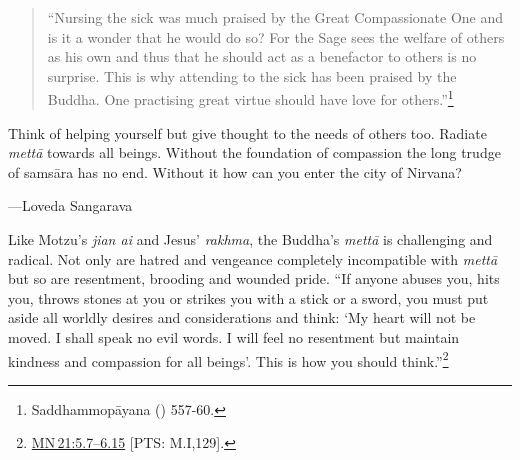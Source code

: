 \documentclass[10pt, openright]{book}
\newenvironment{epigram-2}%
{%
\setstretch{1.4}
\vspace{1em}
\noindent
\quoting[leftmargin=2cm,rightmargin=2cm]%
\begin{itshape}
\large
}%
{\end{itshape}\endquoting
}%
\newenvironment{epigram-2-cite}%
{%
\quoting[leftmargin=2cm,rightmargin=2cm]%
\noindent\normal\hspace*{\fill} 
}%
{\endquoting
}%
\begin{document}
\begin{quote}


“Nursing the sick was much praised by the Great Compassionate One and is it a wonder that he would do so? For the Sage sees the welfare of others as his own and thus that he should act as a benefactor to others is no surprise. This is why attending to the sick has been praised by the Buddha. One practising great virtue should have love for others.”\footnote {Saddhammopāyana (\cite{Hazlewood 1988a}) 557-60.}




\end{quote}
\begin{epigram-2}
Think of helping yourself but give thought to the needs of others too. Radiate \textit{mettā} towards all beings. Without the foundation of compassion the long trudge of samsāra has no end. Without it how can you enter the city of Nirvana?
\end{epigram-2}
\begin{epigram-2-cite}
—Loveda Sangarava
\end{epigram-2-cite}

Like Motzu’s \textit{jian ai} and Jesus’ \textit{rakhma}, the Buddha’s \textit{mettā} is challenging and radical. Not only are hatred and vengeance completely incompatible with \textit{mettā} but so are resentment, brooding and wounded pride. “If anyone abuses you, hits you, throws stones at you or strikes you with a stick or a sword, you must put aside all worldly desires and considerations and think: ‘My heart will not be moved. I shall speak no evil words. I will feel no resentment but maintain kindness and compassion for all beings’. This is how you should think.”\footnote {\href{https://suttacentral.net/mn21/en/sujato\#5.7}{MN 21:5.7–6.15} [PTS: M.I,129].}
\end{document}

